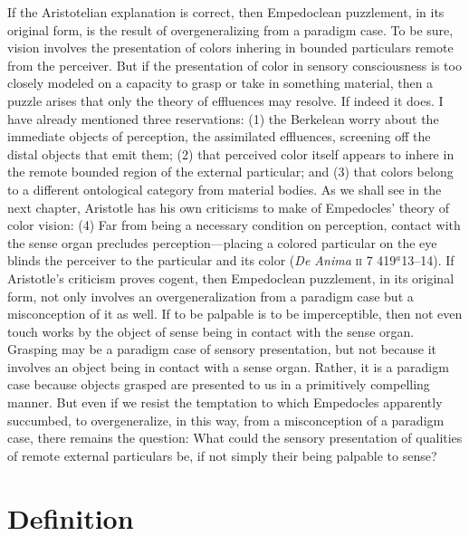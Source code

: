 If the Aristotelian explanation is correct, then Empedoclean puzzlement, in its original form, is the result of overgeneralizing from a paradigm case. To be sure, vision involves the presentation of colors inhering in bounded particulars remote from the perceiver. But if the presentation of color in sensory consciousness is too closely modeled on a capacity to grasp or take in something material, then a puzzle arises that only the theory of effluences may resolve. If indeed it does. I have already mentioned three reservations: (1) the Berkelean worry about the immediate objects of perception, the assimilated effluences, screening off the distal objects that emit them; (2) that perceived color itself appears to inhere in the remote bounded region of the external particular; and (3) that colors belong to a different ontological category from material bodies. As we shall see in the next chapter, Aristotle has his own criticisms to make of Empedocles' theory of color vision: (4) Far from being a necessary condition on perception, contact with the sense organ precludes perception---placing a colored particular on the eye blinds the perceiver to the particular and its color (\emph{De Anima} \textsc{ii} 7 419\( ^{a} \)13--14). If Aristotle's criticism proves cogent, then Empedoclean puzzlement, in its original form, not only involves an overgeneralization from a paradigm case but a misconception of it as well. If to be palpable is to be imperceptible, then not even touch works by the object of sense being in contact with the sense organ. Grasping may be a paradigm case of sensory presentation, but not because it involves an object being in contact with a sense organ. Rather, it is a paradigm case because objects grasped are presented to us in a primitively compelling manner. But even if we resist the temptation to which Empedocles apparently succumbed, to overgeneralize, in this way, from a misconception of a paradigm case, there remains the question: What could the sensory presentation of qualities of remote external particulars be, if not simply their being palpable to sense?


\section{Definition} %
\label{sec:definition}

